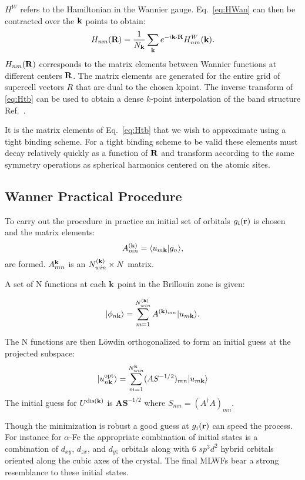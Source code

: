 $H^{W}$ refers to the Hamiltonian in the Wannier gauge. Eq.~\ref{eq:HWan} can then be contracted
over the ${\bf k}$ points to obtain:
%
\begin{equation}
\label{eq:Htb}
H_{nm}({\bf R}) = \frac{1}{N_{{\bf k}}} \sum_{{\bf k}} e^{-i{\bf k}\cdot{\bf R}}H_{nm}^{W}({\bf k}).
\end{equation}
%
$H_{nm}({\bf R})$ corresponds to the matrix elements between Wannier functions at different centers ${\bf R}$. 
The matrix elements are generated for the entire grid of supercell vectors $R$ that
are dual to the chosen kpoint. The inverse transform of \ref{eq:Htb} can be used to obtain a
dense $k$-point interpolation of the band structure Ref.~\cite{yates07}.

It is the matrix elements of Eq.~\ref{eq:Htb} that we wish to approximate using a tight binding scheme.
For a tight binding scheme to be valid these elements must decay relatively quickly 
as a function of ${\bf R}$ and transform according to the same symmetry operations as spherical harmonics
centered on the atomic sites. 

\subsection{Wanner Practical Procedure}
To carry out the procedure in practice an initial set of orbitals 
${g_{i}({\bf r})}$ is chosen and the matrix elements:
%
\begin{equation}
\label{eq:overlap}
A^{({\bf k})}_{mn} = \langle u_{m{\bf k}}|g_{n} \rangle,
\end{equation}
%
are formed. $A^{{\bf k}}_{mn}$ is an $N^{({\bf k})}_{win} \times N$ matrix. 

A set of N functions at each ${\bf k}$ point in the Brillouin zone is given:

\begin{equation}
|\phi_{n{\bf k}} \rangle = \sum_{m=1}^{N^{({\bf k})}_{win}} A^{({\bf k})_{mn}} |u_{m{\bf k}}\rangle.
\end{equation}

The N functions are then L\"owdin orthogonalized to form an 
initial guess at the projected subspace:
%
\begin{equation}
|u^{\rm opt}_{n{\bf k}} \rangle = \sum_{m=1}^{N^{{\bf k}}_{win}}(AS^{-1/2})_{mn}|u_{m{\bf k}}\rangle
\end{equation}
%
The initial guess for $U^{\rm dis ({\bf k})}$ is $\mathbf{A}\mathbf{S}^{-1/2}$ 
where $S_{mn}=(A^{\dagger}A)_{mn}$.

Though the minimization is robust a good guess at $g_{i}({\bf r})$ can speed the process.
For instance for $\alpha$-Fe the appropriate combination of initial states is a combination of 
$d_{xy}$, $d_{zx}$, and $d_{yz}$ orbitals along with 6 $sp^{3}d^{2}$ hybrid orbitals oriented along the 
cubic axes of the crystal. The final MLWFs bear a strong resemblance to these initial states.

